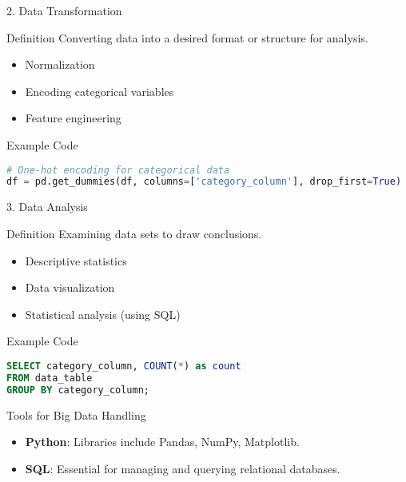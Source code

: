\documentclass[aspectratio=169]{beamer}
\begin{document}
\begin{frame}[fragile]{2. Data Transformation}
    \begin{block}{Definition}
        Converting data into a desired format or structure for analysis.
    \end{block}
    \begin{itemize}
        \item Normalization
        \item Encoding categorical variables
        \item Feature engineering
    \end{itemize}
    \begin{block}{Example Code}
    \begin{lstlisting}[language=Python]
# One-hot encoding for categorical data
df = pd.get_dummies(df, columns=['category_column'], drop_first=True)
    \end{lstlisting}
    \end{block}
\end{frame}

\begin{frame}[fragile]{3. Data Analysis}
    \begin{block}{Definition}
        Examining data sets to draw conclusions.
    \end{block}
    \begin{itemize}
        \item Descriptive statistics
        \item Data visualization
        \item Statistical analysis (using SQL)
    \end{itemize}
    \begin{block}{Example Code}
    \begin{lstlisting}[language=SQL]
SELECT category_column, COUNT(*) as count 
FROM data_table 
GROUP BY category_column;
    \end{lstlisting}
    \end{block}
\end{frame}

\begin{frame}{Tools for Big Data Handling}
    \begin{itemize}
        \item \textbf{Python}: Libraries include Pandas, NumPy, Matplotlib.
        \item \textbf{SQL}: Essential for managing and querying relational databases.
    \end{itemize}
\end{frame}
\end{document}
